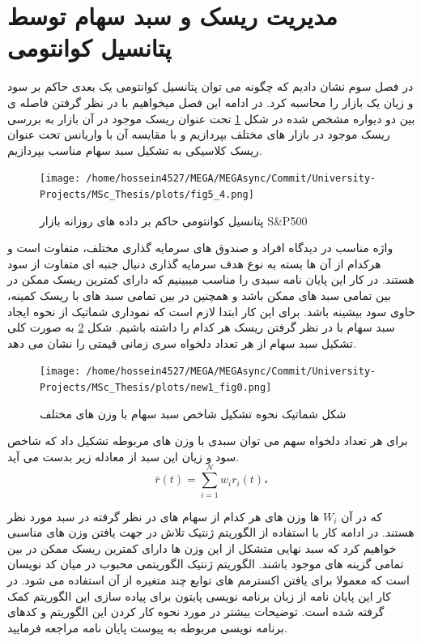 \documentclass[a4paper,titlepage,12pt,fleqn,oneside]{report}
\begin{document}
	\section{مدیریت ریسک و سبد سهام توسط پتانسیل کوانتومی}
	در فصل سوم نشان دادیم که چگونه می توان پتانسیل کوانتومی یک بعدی حاکم بر سود و زیان یک بازار را محاسبه کرد. در ادامه این فصل میخواهیم با در نظر گرفتن فاصله ی بین دو دیواره مشخص شده در شکل
	\ref{fig:5.3}
	تحت عنوان ریسک موجود در آن بازار به بررسی ریسک موجود در بازار های مختلف بپردازیم و با مقایسه آن با واریانس تحت عنوان ریسک کلاسیکی به تشکیل سبد سهام مناسب بپردازیم. 
	\begin{figure}[ptb]
		\centering
		\texttt{[image: /home/hossein4527/MEGA/MEGAsync/Commit/University-Projects/MSc\_Thesis/plots/fig5\_4.png]}
		\caption{پتانسیل کوانتومی حاکم بر داده های روزانه بازار S\&P500}
		\label{fig:5.3}
	\end{figure}
	واژه مناسب در دیدگاه افراد و صندوق های سرمایه گذاری مختلف، متفاوت است و هرکدام از آن ها بسته به نوع هدف سرمایه گذاری دنبال جنبه ای متفاوت از سود هستند. در کار این پایان نامه سبدی را مناسب میبینیم که دارای کمترین ریسک ممکن در بین تمامی سبد های ممکن باشد و همچنین در بین تمامی سبد های با ریسک کمینه، حاوی سود بیشینه باشد.  برای این کار ابتدا لازم است که نموداری شماتیک از نحوه ایجاد سبد سهام با در نظر گرفتن ریسک هر کدام را داشته باشیم.  شکل 
	\ref{fig:5.4}
	به صورت کلی تشکیل سبد سهام از هر تعداد دلخواه سری زمانی قیمتی را نشان می دهد. 
	\begin{figure}[ptb]
		\centering
		\texttt{[image: /home/hossein4527/MEGA/MEGAsync/Commit/University-Projects/MSc\_Thesis/plots/new1\_fig0.png]}
		\caption{شکل شماتیک نحوه تشکیل شاخص سبد سهام با وزن های مختلف}
		\label{fig:5.4}
	\end{figure}
	
	برای هر تعداد دلخواه سهم می توان سبدی با وزن های مربوطه تشکیل داد که شاخص سود و زیان این سبد از معادله زیر بدست می آید.
	\begin{equation}
		\bar{r}(t)=\sum_{i=1}^{N} w _{i}r_{i}(t)،
		\label{eq:3}
	\end{equation}
	
	که در آن
	$W_i$
	ها وزن های هر کدام از سهام های در نظر گرفته در سبد مورد نظر  هستند. در ادامه کار با استفاده از الگوریتم ژنتیک تلاش در جهت یافتن وزن های مناسبی خواهیم کرد که سبد نهایی متشکل از این وزن ها دارای کمترین ریسک ممکن در بین تمامی گزینه های موجود باشند. 
	الگوریتم ژنتیک الگوریتمی محبوب در میان کد نویسان است که معمولا برای یافتن اکسترمم های توابع چند متغیره از آن استفاده می شود. در کار این پایان نامه از زبان برنامه نویسی پایتون برای پیاده سازی این الگوریتم کمک گرفته شده است. 
	توضیحات بیشتر در مورد نحوه کار کردن این الگوریتم و کدهای برنامه نویسی مربوطه به پیوست پایان نامه مراجعه فرمایید. 
	
\end{document}
